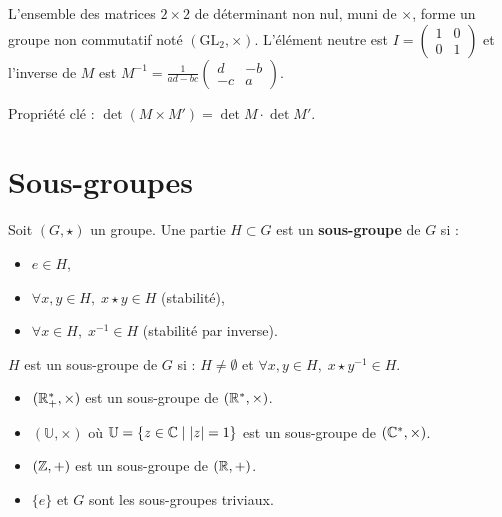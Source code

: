 \begin{propbox}
L'ensemble des matrices $2 \times 2$ de déterminant non nul, muni de $\times$, forme un groupe non commutatif noté $(\mathrm{GL}_2, \times)$. L'élément neutre est $I = \begin{pmatrix} 1 & 0 \\ 0 & 1 \end{pmatrix}$ et l'inverse de $M$ est $M^{-1} = \frac{1}{ad-bc}\begin{pmatrix} d & -b \\ -c & a \end{pmatrix}$.

Propriété clé : $\det(M \times M') = \det M \cdot \det M'$.
\end{propbox}


\section{Sous-groupes}

\begin{defbox}
Soit $(G, \star)$ un groupe. Une partie $H \subset G$ est un \textbf{sous-groupe} de $G$ si :
\begin{itemize}[leftmargin=1cm]
  \item $e \in H$,
  \item $\forall x, y \in H, \; x \star y \in H$ (stabilité),
  \item $\forall x \in H, \; x^{-1} \in H$ (stabilité par inverse).
\end{itemize}
\end{defbox}

\begin{rembox}
$H$ est un sous-groupe de $G$ si : $H \neq \emptyset$ et $\forall x, y \in H, \; x \star y^{-1} \in H$.
\end{rembox}

\begin{exbox}
\begin{itemize}[leftmargin=1cm]
  \item $(\mathbb{R}^*_+, \times)$ est un sous-groupe de $(\mathbb{R}^*, \times)$.
  \item $(\mathbb{U}, \times)$ où $\mathbb{U} = \{z \in \mathbb{C} \mid |z| = 1\}$ est un sous-groupe de $(\mathbb{C}^*, \times)$.
  \item $(\mathbb{Z}, +)$ est un sous-groupe de $(\mathbb{R}, +)$.
  \item $\{e\}$ et $G$ sont les sous-groupes triviaux.
\end{itemize}
\end{exbox}


